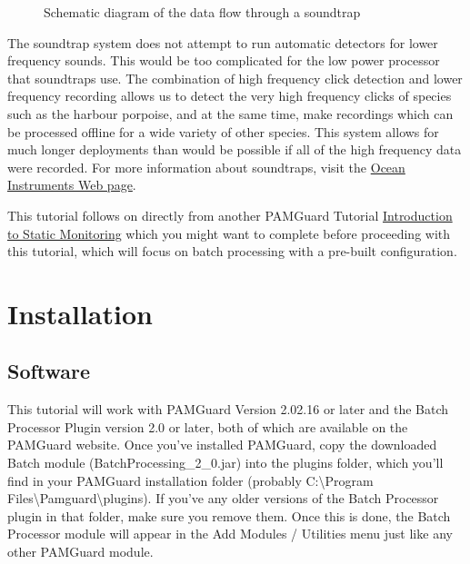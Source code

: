 \documentclass[
]{article}
\begin{document}
\begin{figure}


\caption{\label{fig-soundtrapflow}Schematic diagram of the data flow
through a soundtrap}

\end{figure}%

The soundtrap system does not attempt to run automatic detectors for
lower frequency sounds. This would be too complicated for the low power
processor that soundtraps use. The combination of high frequency click
detection and lower frequency recording allows us to detect the very
high frequency clicks of species such as the harbour porpoise, and at
the same time, make recordings which can be processed offline for a wide
variety of other species. This system allows for much longer deployments
than would be possible if all of the high frequency data were recorded.
For more information about soundtraps, visit the
\href{https://www.oceaninstruments.co.nz/}{Ocean Instruments Web page}.

This tutorial follows on directly from another PAMGuard Tutorial
\href{https://www.pamguard.org/tutorials/staticmonitoring.html}{Introduction
to Static Monitoring} which you might want to complete before proceeding
with this tutorial, which will focus on batch processing with a
pre-built configuration.

\section{Installation}\label{installation}

\subsection{Software}\label{software}

This tutorial will work with PAMGuard Version 2.02.16 or later and the
Batch Processor Plugin version 2.0 or later, both of which are available
on the PAMGuard website. Once you've installed PAMGuard, copy the
downloaded Batch module (BatchProcessing\_2\_0.jar) into the plugins
folder, which you'll find in your PAMGuard installation folder (probably
C:\textbackslash Program
Files\textbackslash Pamguard\textbackslash plugins). If you've any older
versions of the Batch Processor plugin in that folder, make sure you
remove them. Once this is done, the Batch Processor module will appear
in the Add Modules / Utilities menu just like any other PAMGuard module.
\end{document}
